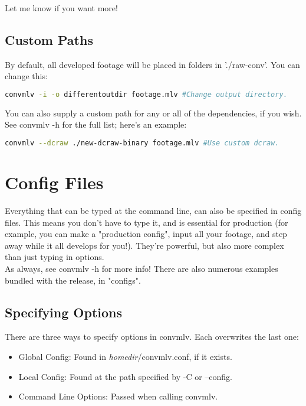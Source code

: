 \documentclass[a4paper,12pt]{article}
\begin{document}
		Let me know if you want more!
	
	\subsection{Custom Paths}
		By default, all developed footage will be placed in folders in './raw-conv'. You can change this:
		
\begin{lstlisting}[language=bash]
	convmlv -i -o differentoutdir footage.mlv #Change output directory.
\end{lstlisting}
	
		You can also supply a custom path for any or all of the dependencies, if you wish. See convmlv -h for the full list; here's an example:
		
\begin{lstlisting}[language=bash]
	convmlv --dcraw ./new-dcraw-binary footage.mlv #Use custom dcraw.
\end{lstlisting}

\section{Config Files}
	Everything that can be typed at the command line, can also be specified in config files. This means you don't have to type it, and is essential
	for production (for example, you can make a "production config", input all your footage, and step away while it all develops for you!). They're
	powerful, but also more complex than just typing in options.\\
	
	As always, see convmlv -h for more info! There are also numerous examples bundled with the release, in "configs".
	
	\subsection{Specifying Options}
	
		There are three ways to specify options in convmlv. Each overwrites the last one:
		\begin{itemize}
			\item Global Config: Found in \textit{homedir}/convmlv.conf, if it exists.
			\item Local Config: Found at the path specified by -C or --config.
			\item Command Line Options: Passed when calling convmlv.
		\end{itemize}
		
\end{document}
